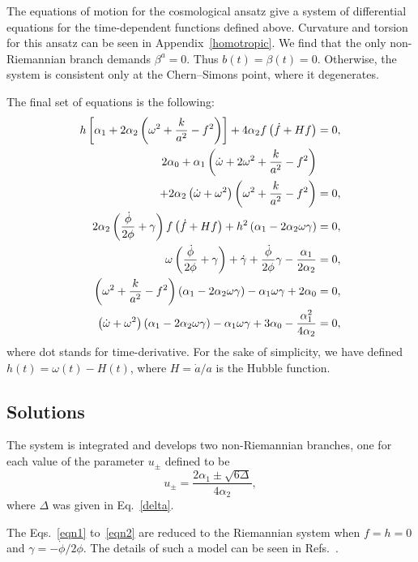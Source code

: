 \documentclass[aps,prd,12pt,superscriptaddress,showpacs,showkeys,longbibliography,reprint,nofootinbib]{revtex4-1}
\begin{document}
The equations of motion for the cosmological ansatz give a system of differential equations for the time-dependent functions defined above. Curvature and torsion for this ansatz can be seen in Appendix~\ref{homotropic}. We find that the only non-Riemannian branch demands  $\beta^a=0$. Thus $b(t)=\beta(t)=0$. Otherwise, the system is consistent only at the Chern--Simons point, where it degenerates. 

The final set of equations is the following:
\begin{align}
  \label{eqn1}
  h\left[\alpha_1+2\alpha_2\left(\omega^2+\frac{k}{a^2}-f^2\right)\right]+4\alpha_2f\left(\dot{f}+Hf\right)&=0,\\
  2\alpha_0+\alpha_1\left(\dot{\omega}+2\omega^2+\frac{k}{a^2}-f^2\right)\notag\\
  +2\alpha_2\left(\dot{\omega}+\omega^2\right)\left(\omega^2+\frac{k}{a^2}-f^2\right)&=0,\\
  2\alpha_2\left(\frac{\dot{\phi}}{2\phi}+\gamma\right)f\left(\dot{f}+Hf\right)
  +h^2\left(\alpha_1-2\alpha_2\omega\gamma\right)&=0,\\
  \omega\left(\frac{\dot{\phi}}{2\phi}+\gamma\right)+\dot{\gamma}+\frac{\dot{\phi}}{2\phi}\gamma-\frac{\alpha_1}{2\alpha_2}&=0,\\
  \left(\omega^2+\frac{k}{a^2}-f^2\right)\left(\alpha_1-2\alpha_2\omega\gamma\right)-\alpha_1\omega\gamma+2\alpha_0&=0,\\
  \label{eqn2}
  \left(\dot{\omega}+\omega^2\right)\left(\alpha_1-2\alpha_2\omega\gamma\right)-\alpha_1
  \omega\gamma+3\alpha_0-\frac{\alpha^2_1}{4\alpha_2}&=0,
\end{align}
where dot stands for time-derivative. For the sake of simplicity, we have defined $h(t)=\omega(t)-H(t)$, where $H=\dot{a}/a$ is the Hubble function.

\subsection{Solutions}

The system is integrated and develops two non-Riemannian branches, one for each value of the parameter $u_\pm$ defined to be
\begin{equation}\label{u}
  u_\pm=\frac{2\alpha_1\pm\sqrt{6\Delta}}{4\alpha_2},
\end{equation}
where $\Delta$ was given in Eq.~\eqref{delta}.

The Eqs.~\eqref{eqn1} to~\eqref{eqn2} are reduced to the Riemannian system when \mbox{$f=h=0$} and \mbox{$\gamma=-\dot{\phi}/2\phi$}. The details of such a model can be seen in Refs.~\cite{Deruelle:1986iv,Deruelle:2003ck,Henriques:1986jw,Ishihara:1986if,Kleidis:1997mu}.
\end{document}
